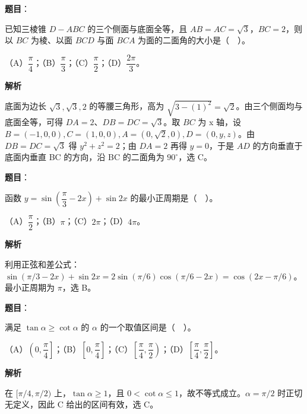 \begin{answer}

\textbf{题目}：

已知三棱锥 $D-ABC$ 的三个侧面与底面全等，且 $AB=AC=\sqrt3$，$BC=2$，则以 $BC$ 为棱、以面 $BCD$ 与面 $BCA$ 为面的二面角的大小是（　）。

（A）$\dfrac\pi4$；（B）$\dfrac\pi3$；（C）$\dfrac\pi2$；（D）$\dfrac{2\pi}3$。

\textbf{解析}

底面为边长 $\sqrt3,\sqrt3,2$ 的等腰三角形，高为 $\sqrt{3-(1)^2}=\sqrt2$。由三个侧面均与底面全等，可得 $DA=2$、$DB=DC=\sqrt3$。取 $BC$ 为 x 轴，设 $B=(-1,0,0),C=(1,0,0),A=(0,\sqrt2,0),D=(0,y,z)$。由 $DB=DC=\sqrt3$ 得 $y^2+z^2=2$；由 $DA=2$ 再得 $y=0$，于是 $AD$ 的方向垂直于底面内垂直 BC 的方向，沿 BC 的二面角为 $90^\circ$，选 C。


\end{answer}
\begin{answer}

\textbf{题目}：

函数 $y=\sin\left(\dfrac\pi3-2x\right)+\sin2x$ 的最小正周期是（　）。

（A）$\dfrac\pi2$；（B）$\pi$；（C）$2\pi$；（D）$4\pi$。

\textbf{解析}

利用正弦和差公式：$\sin(\pi/3-2x)+\sin2x=2\sin(\pi/6)\cos(\pi/6-2x)=\cos(2x-\pi/6)$。最小正周期为 $\pi$，选 B。


\end{answer}
\begin{answer}

\textbf{题目}：

满足 $\tan\alpha\ge\cot\alpha$ 的 $\alpha$ 的一个取值区间是（　）。

（A）$\left(0,\dfrac\pi4\right]$；（B）$\left[0,\dfrac\pi4\right]$；（C）$\left[\dfrac\pi4,\dfrac\pi2\right)$；（D）$\left[\dfrac\pi4,\dfrac\pi2\right]$。

\textbf{解析}

在 $[\pi/4,\pi/2)$ 上，$\tan\alpha\ge1$，且 $0<\cot\alpha\le1$，故不等式成立。$\alpha=\pi/2$ 时正切无定义，因此 C 给出的区间有效，选 C。


\end{answer}
